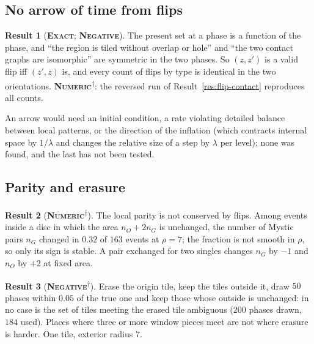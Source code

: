 \documentclass[11pt]{article}
\newcommand{\exact}{\textbf{\textsc{Exact}}}
\newcommand{\numeric}{\textbf{\textsc{Numeric}}}
\newcommand{\negres}{\textbf{\textsc{Negative}}}
\newcommand{\snap}{\textsuperscript{$\dagger$}}      %
\theoremstyle{definition}
\newtheorem{result}{Result}
\begin{document}
\subsection{No arrow of time from flips}
\begin{result}[\exact; \negres]\label{res:flip-symmetry}
The present set at a phase is a function of the phase, and ``the region is tiled without overlap or hole'' and ``the two contact graphs are isomorphic'' are symmetric in the two phases. So $(z,z')$ is a valid flip iff $(z',z)$ is, and every count of flips by type is identical in the two orientations. \numeric\snap: the reversed run of Result~\ref{res:flip-contact} reproduces all counts.
\end{result}
An arrow would need an initial condition, a rate violating detailed balance between local patterns, or the direction of the inflation (which contracts internal space by $1/\lambda$ and changes the relative size of a step by $\lambda$ per level); none was found, and the last has not been tested.

\subsection{Parity and erasure}
\begin{result}[\numeric\snap]\label{res:flip-parity-change}
The local parity is not conserved by flips. Among events inside a disc in which the area $n_O+2n_G$ is unchanged, the number of Mystic pairs $n_G$ changed in $0.32$ of $163$ events at $\rho=7$; the fraction is not smooth in $\rho$, so only its sign is stable. A pair exchanged for two singles changes $n_G$ by $-1$ and $n_O$ by $+2$ at fixed area.
\end{result}
\begin{result}[\negres\snap]\label{res:flip-erasure}
Erase the origin tile, keep the tiles outside it, draw $50$ phases within $0.05$ of the true one and keep those whose outside is unchanged: in no case is the set of tiles meeting the erased tile ambiguous ($200$ phases drawn, $184$ used). Places where three or more window pieces meet are not where erasure is harder. One tile, exterior radius $7$.
\end{result}
\end{document}
